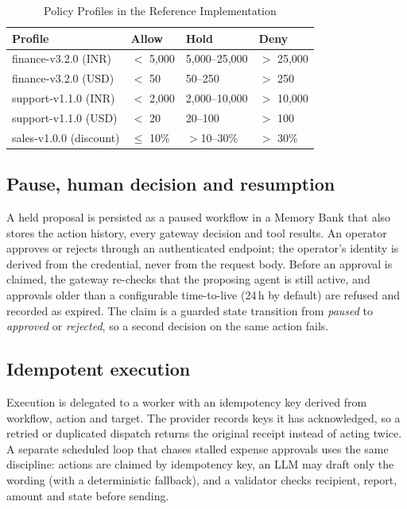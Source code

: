 \documentclass[conference]{IEEEtran}
\begin{document}
\begin{table}[t]
\caption{Policy Profiles in the Reference Implementation}
\label{tab:policy}
\centering
\begin{tabular}{|l|l|l|l|}
\hline
\textbf{Profile} & \textbf{Allow} & \textbf{Hold} & \textbf{Deny} \\
\hline
finance-v3.2.0 (INR) & $<$ 5,000 & 5,000--25,000 & $>$ 25,000 \\
finance-v3.2.0 (USD) & $<$ 50 & 50--250 & $>$ 250 \\
support-v1.1.0 (INR) & $<$ 2,000 & 2,000--10,000 & $>$ 10,000 \\
support-v1.1.0 (USD) & $<$ 20 & 20--100 & $>$ 100 \\
sales-v1.0.0 (discount) & $\le$ 10\% & $>$10--30\% & $>$ 30\% \\
\hline
\end{tabular}
\end{table}

\subsection{Pause, human decision and resumption}
A held proposal is persisted as a paused workflow in a Memory Bank that also stores the action history, every gateway decision and tool results. An operator approves or rejects through an authenticated endpoint; the operator's identity is derived from the credential, never from the request body. Before an approval is claimed, the gateway re-checks that the proposing agent is still active, and approvals older than a configurable time-to-live (24\,h by default) are refused and recorded as expired. The claim is a guarded state transition from \emph{paused} to \emph{approved} or \emph{rejected}, so a second decision on the same action fails.

\subsection{Idempotent execution}
Execution is delegated to a worker with an idempotency key derived from workflow, action and target. The provider records keys it has acknowledged, so a retried or duplicated dispatch returns the original receipt instead of acting twice. A separate scheduled loop that chases stalled expense approvals uses the same discipline: actions are claimed by idempotency key, an LLM may draft only the wording (with a deterministic fallback), and a validator checks recipient, report, amount and state before sending.
\end{document}
